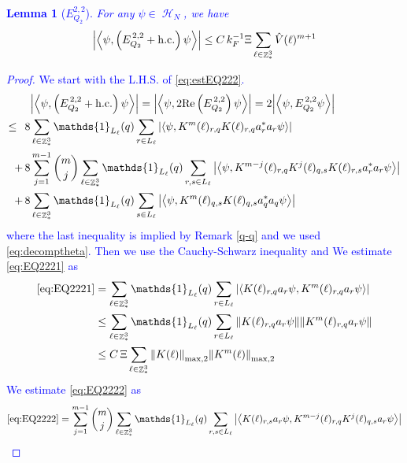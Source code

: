 \documentclass[sn-mathphys, Numbered ,a4paper]{sn-jnl}%
\DeclareMathOperator{\Z}{\mathbb{Z}}
\DeclareMathOperator{\HH}{\mathcal{H}}
\newcommand{\eva}[1]{\left\langle #1 \right\rangle}
\theoremstyle{plain}
\newtheorem{lemma}[theorem]{Lemma}
\theoremstyle{definition}
\theoremstyle{remark}
\theoremstyle{plain}
\theoremstyle{definition}
\theoremstyle{remark}
\begin{document}
\textcolor{blue}{\begin{lemma}[$E_{Q_2}^{2,2}$]\label{lem:EQ222}
For any $\psi \in \HH_N$, we have
\begin{equation}
    \abs{\eva{\psi,\left(E^{\,2,2}_{Q_2}+\mathrm{h.c.}\right) \psi }}
   \leq   C\, k_{F}^{-1} \Xi \sum\limits_{\ell \in \Z^3_*} \hat{V}(\ell)^{m+1}  \label{eq:estEQ222}
    \end{equation}
\end{lemma}
\begin{proof}
We start with the L.H.S. of \eqref{eq:estEQ222}.
\begin{align}
	&\abs{\eva{\psi,\left(E^{\,2,2}_{Q_2}+\mathrm{h.c.}\right) \psi }} = \abs{\eva{\psi,2\mathrm{Re}\left(E^{\,2,2}_{Q_2}\right) \psi }} = 2\abs{\eva{\psi, E^{\,2,2}_{Q_2} \psi }}\nonumber\\
	\leq\,\;8& \sum\limits_{\ell \in \Z^3_*} \mathds{1}_{L_{\ell}}(q) \sum\limits_{r\in L_{\ell}} \abs{\eva{\psi, K^m(\ell)_{r,q} K(\ell)_{r,q} a^*_{r} a_{r} \psi }}\label{eq:EQ2221}\\
	+\,8& \sum\limits_{j=1}^{m-1} {{m}\choose j} \sum\limits_{\ell \in \Z^3_*}\mathds{1}_{L_{\ell}}(q) \sum\limits_{r,s\in L_{\ell}}  \abs{\eva{\psi,K^{m-j}(\ell)_{r,q} K^{j}(\ell)_{q,s} K(\ell)_{r,s} a^*_{r} a_{r}   \psi }}\label{eq:EQ2222}\\
	+\,8&\sum\limits_{\ell \in \Z^3_*} \mathds{1}_{L_{\ell}}(q) \sum\limits_{ s \in L_{\ell}} \abs{\eva{\psi, K^m(\ell)_{q,s} K(\ell)_{q,s} a^*_{q} a_{q} \psi }}\label{eq:EQ2223}
\end{align}
where the last inequality is implied by Remark \ref{q-q} and we used \eqref{eq:decomptheta}. Then we use the Cauchy-Schwarz inequality and We estimate \eqref{eq:EQ2221} as 
\begin{align}
	\eqref{eq:EQ2221}
	&= \sum\limits_{\ell \in \Z^3_*} \mathds{1}_{L_{\ell}}(q) \sum\limits_{r\in L_{\ell}} \abs{\eva{ K(\ell)_{r,q} a_{r} \psi, K^m(\ell)_{r,q}  a_{r} \psi }}\nonumber\\
	&\leq \sum\limits_{\ell \in \Z^3_*} \mathds{1}_{L_{\ell}}(q) \sum\limits_{r\in L_{\ell}} \norm{ K(\ell)_{r,q} a_{r} \psi}\norm{ K^m(\ell)_{r,q}  a_{r} \psi }\nonumber\\
	&\leq C\,\Xi\sum\limits_{\ell \in \Z^3_*} \norm{K(\ell)}_{\mathrm{max,2}} \norm{K^m(\ell)}_{\mathrm{max,2}} \label{eq:estEQ2221}
\end{align}
We estimate \eqref{eq:EQ2222} as
\begin{align}
	\eqref{eq:EQ2222}
	&=\sum\limits_{j=1}^{m-1} {{m}\choose j} \sum\limits_{\ell \in \Z^3_*}\mathds{1}_{L_{\ell}}(q) \sum\limits_{r,s\in L_{\ell}}  \abs{\eva{ K(\ell)_{r,s} a_{r}\psi, K^{m-j}(\ell)_{r,q} K^{j}(\ell)_{q,s} a_{r} \psi }}\nonumber\\

\end{align}
\end{proof}}
\end{document}
